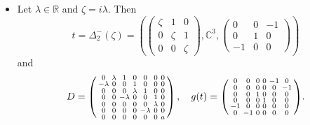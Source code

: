 \documentclass{article}
\theoremstyle{definition}
\newcommand{\R}{\mathbb{R}}
\newcommand{\C}{\mathbb{C}}
\newenvironment{smallpmatrix}{\left(\begin{smallmatrix}}{\end{smallmatrix}\right)}
\begin{document}
\begin{itemize}
\begin{equation}
\begin{smallmatrix}
        \rho_{1} & \lambda_{1} & 0 & 0 & 0 & 0 & 0 \\
        -\lambda_{1} & \rho_{1} & 0 & 0 & 0 & 0 & 0 \\
        0 & 0 & -\rho_{1} & \lambda_{1} & 0 & 0 & 0 \\
        0 & 0 & -\lambda_{1} & -\rho_{1} & 0 & 0 & 0 \\
        0 & 0 & 0 & 0 & 0 & \lambda_{2} & 0 \\
        0 & 0 & 0 & 0 & -\lambda_{2} & 0 & 0 \\
        0 & 0 & 0 & 0 & 0 & 0 & a
    \end{smallmatrix}\right),\quad g(t)=\begin{smallpmatrix}
        0 & 0 & 0 & 1 & 0 & 0 \\
        0 & 0 & -1 & 0 & 0 & 0 \\
        0 & -1 & 0 & 0 & 0 & 0 \\
        1 & 0 & 0 & 0 & 0 & 0 \\
        0 & 0 & 0 & 0 & 1 & 0 \\
        0 & 0 & 0 & 0 & 0 & 1
    \end{smallpmatrix}.\end{equation}
    \item Let $\lambda\in\R$ and $\zeta=i\lambda$. Then $$t=\Delta_2^-(\zeta)=\left(\begin{pmatrix}
        \zeta&1&0\\
        0&\zeta&1\\
        0&0&\zeta
    \end{pmatrix},\C^3,\begin{pmatrix}
        0&0&-1\\
        0&1&0\\
        -1&0&0
    \end{pmatrix}\right)$$ and \begin{equation}\label{8d_noniso_(2,1)-IV}
        D=\left(\begin{smallmatrix}
        0 & \lambda & 1 & 0 & 0 & 0 & 0 \\
        -\lambda & 0 & 0 & 1 & 0 & 0 & 0 \\
        0 & 0 & 0 & \lambda & 1 & 0 & 0 \\
        0 & 0 & -\lambda & 0 & 0 & 1 & 0 \\
        0 & 0 & 0 & 0 & 0 & \lambda & 0 \\
        0 & 0 & 0 & 0 & -\lambda & 0 & 0 \\
        0 & 0 & 0 & 0 & 0 & 0 & a
    \end{smallmatrix}\right),\quad g(t)=\begin{smallpmatrix}
        0 & 0 & 0 & 0 & -1 & 0 \\
        0 & 0 & 0 & 0 & 0 & -1 \\
        0 & 0 & 1 & 0 & 0 & 0 \\
        0 & 0 & 0 & 1 & 0 & 0 \\
        -1 & 0 & 0 & 0 & 0 & 0 \\
        0 & -1 & 0 & 0 & 0 & 0
    \end{smallpmatrix}.\end{equation}
\end{itemize}
\end{document}
